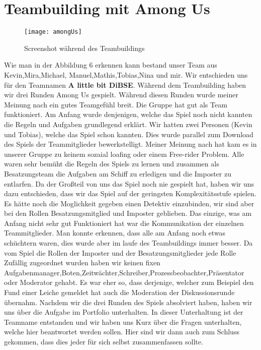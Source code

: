\documentclass[12pt]{article}
\begin{document}
\section{Teambuilding mit Among Us}
\begin{figure}[h]
\begin{center}
\texttt{[image: amongUs]}
\end{center}
\caption{Screenshot während des Teambuildings}
\end{figure}
Wie man in der Abbildung 6 erkennen kann bestand unser Team aus Kevin,Mira,Michael, Manuel,Mathis,Tobias,Nina und mir. Wir entschieden uns für den Teamnamen \textbf{A little bit DiBSE}. Während dem Teambuilding haben wir drei Runden Among Us gespielt. Während diesen Runden wurde meiner Meinung nach ein gutes Teamgefühl breit. Die Gruppe hat gut als Team funktioniert. Am Anfang wurde denjenigen, welche das Spiel noch nicht kannten die Regeln und Aufgaben grundlegend erklärt. Wir hatten zwei Personen (Kevin und Tobias), welche das Spiel schon kannten. Dies wurde parallel zum Download des Spiels der Teammitglieder bewerkstelligt. Meiner Meinung nach hat kam es in unserer Gruppe zu keinem sozaial loafing oder einem Free-rider Problem. Alle waren sehr bemüht die Regeln des Spiels zu lernen und zusammen als Besatzungsteam die Aufgaben am Schiff zu erledigen und die Imposter zu entlarfen. Da der Großteil von uns das Spiel noch nie gespielt hat, haben wir uns dazu entschieden, dass wir das Spiel auf der geringsten Komplexitätsstufe spielen. Es hätte noch die Moglichkeit gegeben einen Detektiv einzubinden, wir sind aber bei den Rollen Besatzungsmitglied und Imposter geblieben. Das einzige, was am Anfang nicht sehr gut Funktioniert hat war die Kommunikation der einzelnen Teammitglieder. Man konnte erkennen, dass alle am Anfang noch etwas schüchtern waren, dies wurde aber im laufe des Teambuildings immer besser. Da vom Spiel die Rollen der Imposter und der Besatzungsmitglieder jede Rolle Zufällig zugeordnet wurden haben wir keinen fixen Aufgabenmanager,Boten,Zeitwächter,Schreiber,Prozessbeobachter,Präsentator oder Moderator gehabt. Es war eher so, dass derjenige, welcher zum Beispiel den Fund einer Leiche gemeldet hat auch die Moderation der Diskussionsrunde übernahm. Nachdem wir die drei Runden des Spiels  absolviert haben, haben wir uns über die Aufgabe im Portfolio unterhalten. In dieser Unterhaltung ist der Teamname entstanden und wir haben uns Kurz über die Fragen unterhalten, welche hier beantwortet werden sollen. Hier sind wir dann auch zum Schluss gekommen, dass dies jeder für sich selbst zusammenfassen sollte.\vspace{0.5cm}\\
\end{document}
